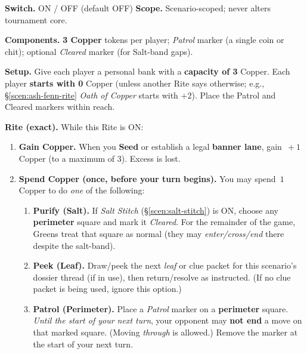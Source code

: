 \documentclass[11pt]{article}
\numberwithin{equation}{section} %
\theoremstyle{plain} %
\theoremstyle{definition} %
\theoremstyle{remark} %
\begin{document}
\medskip
\noindent\textbf{Switch.} \textsc{ON / OFF} (default \textsc{OFF}) \hfill \textbf{Scope.} Scenario-scoped; never alters tournament core.

\medskip
\noindent\textbf{Components.} \textbf{3 Copper} tokens per player; \emph{Patrol} marker (a single coin or chit); optional \emph{Cleared} marker (for Salt-band gaps).

\medskip
\noindent\textbf{Setup.} Give each player a personal bank with a \textbf{capacity of 3} Copper. Each player \textbf{starts with 0} Copper (unless another Rite says otherwise; e.g., \S\ref{scen:ash-fenn-rite} \emph{Oath of Copper} starts with \(+2\)). Place the Patrol and Cleared markers within reach.

\medskip
\noindent\textbf{Rite (exact).} While this Rite is \textsc{ON}:
\begin{enumerate}\setlength\itemsep{0.2em}
  \item \textbf{Gain Copper.} When you \textbf{Seed} or establish a legal \textbf{banner lane}, gain \(\,+1\) Copper (to a maximum of 3). Excess is lost.
  \item \textbf{Spend Copper (once, before your turn begins).} You may spend \(\,1\) Copper to do \emph{one} of the following:
  \begin{enumerate}\setlength\itemsep{0.2em}
    \item \textbf{Purify (Salt).} If \emph{Salt Stitch} (\S\ref{scen:salt-stitch}) is \textsc{ON}, choose any \textbf{perimeter} square and mark it \emph{Cleared}. For the remainder of the game, Greens treat that square as normal (they may \emph{enter/cross/end} there despite the salt-band). 
    \item \textbf{Peek (Leaf).} Draw/peek the next \emph{leaf} or clue packet for this scenario's dossier thread (if in use), then return/resolve as instructed. (If no clue packet is being used, ignore this option.)
    \item \textbf{Patrol (Perimeter).} Place a \emph{Patrol} marker on a \textbf{perimeter} square. \textit{Until the start of your next turn}, your opponent may \textbf{not end} a move on that marked square. (Moving \emph{through} is allowed.) Remove the marker at the start of your next turn.
  \end{enumerate}
\end{enumerate}
\end{document}
